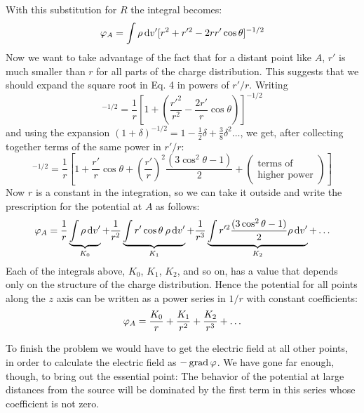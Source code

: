 With this substitution for $R$ the integral becomes:
\begin{equation}
  \varphi_A = \int \rho\operatorname{d\!} v'[r^2 + r'^2 - 2rr'\cos\theta]^{-1/2}
\end{equation}
Now we want to take advantage of the fact that for a distant point
like $A$, $r'$ is much smaller than $r$ for all parts of the charge distribution.
This suggests that we should expand the square root in Eq. 4 in
powers of $r'/r$. Writing
\begin{equation}
  [r^2 + r'^2 - 2rr'\cos\theta]^{-1/2} 
      = \frac{1}{r}\left[1+\left(\frac{r'^2}{r^2}-\frac{2r'}{r}\cos\theta\right)\right]^{-1/2}
\end{equation}
and using the expansion $(1+\delta)^{-1/2}=1-\frac{1}{2}\delta+\frac{3}{8}\delta^2\ldots$, we get,
after collecting together terms of the same power in $r'/r$:
\begin{equation}
  [r^2 + r'^2 - 2rr'\cos\theta]^{-1/2}
   = \frac{1}{r}\left[1+\frac{r'}{r}\cos\theta
                       +\left(\frac{r'}{r}\right)^2\frac{(3\cos^2\theta-1)}{2}
                       +\left(\begin{array}{c}\text{terms of}\\\text{higher power}\end{array}\right)\right]
\end{equation}
Now $r$ is a constant in the integration, so we can take it outside and
write the prescription for the potential at $A$ as follows:
\begin{equation}
  \varphi_A =
        \frac{1}{r}  \underbrace{\int\rho\operatorname{d\!} v'}_{K_0}
       +\frac{1}{r^2}\underbrace{\int r'\cos\theta\:\rho\operatorname{d\!} v'}_{K_1}
       +\frac{1}{r^3}\underbrace{\int r'^2\frac{(3\cos^2\theta-1)}{2}\rho\operatorname{d\!} v'}_{K_2}
       +\ldots
\end{equation}
Each of the integrals above, $K_0$, $K_1$, $K_2$, and so on, has a value that
depends only on the structure of the charge distribution. Hence the
potential for all points along the $z$ axis can be written as a power series
in $1/r$ with constant coefficients:
\begin{equation}
  \varphi_A = \frac{K_0}{r}+\frac{K_1}{r^2}+\frac{K_2}{r^3}+\ldots
\end{equation}

To finish the problem we would have to get the electric field at all
other points, in order to calculate the electric field as  $-\operatorname{grad}\varphi$. We
have gone far enough, though, to bring out the essential point: The
behavior of the potential at large distances from the source will be
dominated by the first term in this series whose coefficient is not zero.

